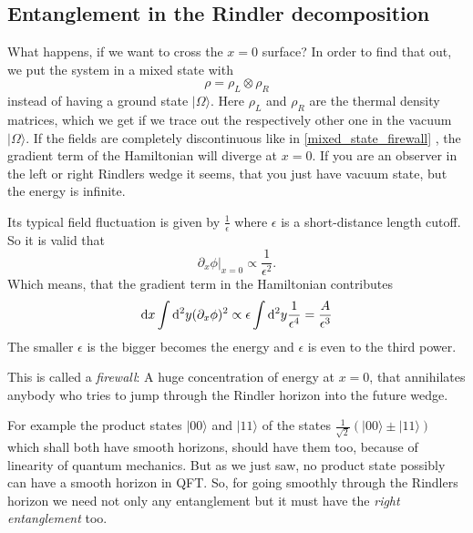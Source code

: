 \subsection{Entanglement in the Rindler decomposition \checkmark}
	What happens, if we want to cross the $x=0$ surface? In order to find that out, we put the system in a mixed state with
		\begin{equation} \label{mixed_state_firewall}
			\rho=\rho_L \otimes \rho_R
		\end{equation}
	instead of having a ground state $|\Omega\rangle$. Here $\rho_L$ and $\rho_R$ are the thermal density matrices, which we get if we trace out the respectively other one in the vacuum $|\Omega\rangle$.
	If the fields are completely discontinuous like in \eqref{mixed_state_firewall} , the gradient term of the Hamiltonian will diverge at $x=0$. If you are an observer in the left or right Rindlers wedge it seems, that you just have vacuum state, but the energy is infinite. 
	
	Its typical field fluctuation is given by $\frac{1}{\epsilon}$ where $\epsilon$ is a short-distance length cutoff.  So it is valid that
		\begin{equation}
			\partial_x \phi|_{x=0} \propto \frac{1}{\epsilon^2}.
		\end{equation}
	Which means, that the gradient term in the Hamiltonian contributes
		\begin{equation}
			\mathrm{d} x \int \mathrm{d}^2 y (\partial_x\phi)^2 \propto 
			\epsilon \int \mathrm{d}^2 y \frac{1}{\epsilon^4} 
			= \frac{A}{\epsilon^3}
		\end{equation}	
	The smaller $\epsilon$ is the bigger becomes the energy and $\epsilon$ is even to the third power.
	 			
	This is called a \textit{firewall}: A huge concentration of energy at $x=0$, that annihilates anybody who tries to jump through the Rindler horizon into the future wedge.
	
	For example the product states $|00\rangle$ and $|11\rangle$ of the states $\frac{1}{\sqrt{2}}
	(|00\rangle \pm |11\rangle)$ which shall both have smooth horizons, should have them too, because of linearity of quantum mechanics. But as we just saw, no product state possibly can have a smooth horizon in QFT. So, for going smoothly through the Rindlers horizon we need not only any entanglement but it must have the \textit{right entanglement} too.